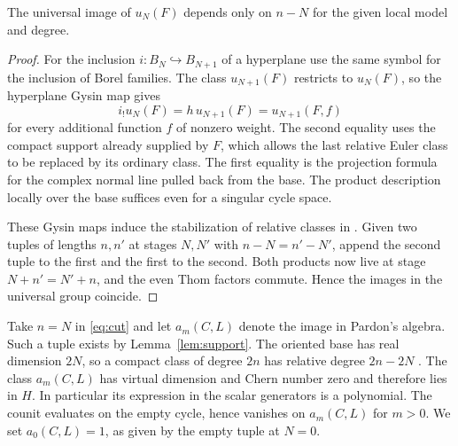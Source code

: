 \begin{lemma}\label{lem:stabilization}
The universal image of $u_N(F)$ depends only on $n-N$ for the given
local model and degree.
\end{lemma}
\begin{proof}
For the inclusion $i:B_N\hookrightarrow B_{N+1}$ of a hyperplane
use the same symbol for the inclusion of Borel families.
The class $u_{N+1}(F)$ restricts to $u_N(F)$, so the hyperplane
Gysin map gives
\[
 i_!u_N(F)=h\,u_{N+1}(F)=u_{N+1}(F,f)
\]
for every additional function $f$ of nonzero weight. The second
equality uses the compact support already supplied by $F$, which
allows the last relative Euler class to be replaced by its ordinary
class. The first equality is the projection formula for the complex
normal line pulled back from the base. The product description
locally over the base suffices even for a singular cycle space.

These Gysin maps induce the stabilization of relative classes in
\cite[(4.5)--(4.7)]{Pardon}. Given two tuples of lengths $n,n'$ at
stages $N,N'$ with $n-N=n'-N'$, append the second tuple to the
first and the first to the second. Both products now live at
stage $N+n'=N'+n$, and the even Thom factors commute. Hence the
images in the universal group coincide.
\end{proof}

Take $n=N$ in \eqref{eq:cut} and let $a_m(C,L)$ denote the image
in Pardon's algebra. Such a tuple exists by Lemma~\ref{lem:support}.
The oriented base has real dimension $2N$, so a compact class of
degree $2n$ has relative degree $2n-2N$ \cite[Lemma~3.5]{Pardon}.
The class $a_m(C,L)$ has virtual dimension and Chern number zero
and therefore lies in $H$. In particular its expression in the
scalar generators is a polynomial. The counit evaluates on the
empty cycle, hence vanishes on $a_m(C,L)$ for $m>0$. We set
$a_0(C,L)=1$, as given by the empty tuple at $N=0$.
